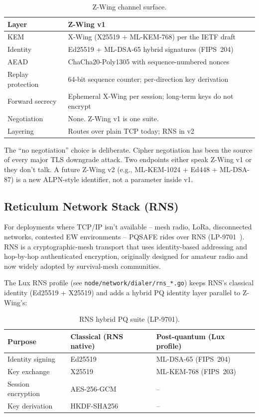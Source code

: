 \documentclass[11pt,a4paper]{article}
\begin{document}
\begin{table}[H]
\centering
\small
\begin{tabularx}{\linewidth}{l X}
\toprule
\textbf{Layer} & \textbf{Z-Wing v1} \\
\midrule
KEM & X-Wing (X25519 + ML-KEM-768) per the IETF draft~\cite{xwing2024} \\
Identity & Ed25519 + ML-DSA-65 hybrid signatures (FIPS~204) \\
AEAD & ChaCha20-Poly1305 with sequence-numbered nonces \\
Replay protection & 64-bit sequence counter; per-direction key derivation \\
Forward secrecy & Ephemeral X-Wing per session; long-term keys do not encrypt \\
Negotiation & None. Z-Wing v1 is one suite. \\
Layering & Routes over plain TCP today; RNS in v2 \\
\bottomrule
\end{tabularx}
\caption{Z-Wing channel surface.}
\end{table}

The ``no negotiation'' choice is deliberate. Cipher negotiation has
been the source of every major TLS downgrade attack. Two endpoints
either speak Z-Wing v1 or they don't talk. A future Z-Wing v2 (e.g.,
ML-KEM-1024 + Ed448 + ML-DSA-87) is a new ALPN-style identifier, not a
parameter inside v1.

\subsection{Reticulum Network Stack (RNS)}
\label{sec:rns}

For deployments where TCP/IP isn't available -- mesh radio, LoRa,
disconnected networks, contested EW environments -- PQSAFE rides over
RNS (LP-9701~\cite{lp9701}). RNS is a cryptographic-mesh transport
that uses identity-based addressing and hop-by-hop authenticated
encryption, originally designed for amateur radio and now widely
adopted by survival-mesh communities.

The Lux RNS profile (see \texttt{node/network/dialer/rns\_*.go}) keeps
RNS's classical identity (Ed25519 + X25519) and adds a hybrid PQ
identity layer parallel to Z-Wing's:

\begin{table}[H]
\centering
\small
\begin{tabularx}{\linewidth}{l X X}
\toprule
\textbf{Purpose} & \textbf{Classical (RNS native)} & \textbf{Post-quantum (Lux profile)} \\
\midrule
Identity signing & Ed25519 & ML-DSA-65 (FIPS~204) \\
Key exchange & X25519 & ML-KEM-768 (FIPS~203) \\
Session encryption & AES-256-GCM & -- \\
Key derivation & HKDF-SHA256 & -- \\
\bottomrule
\end{tabularx}
\caption{RNS hybrid PQ suite (LP-9701).}
\end{table}
\end{document}
